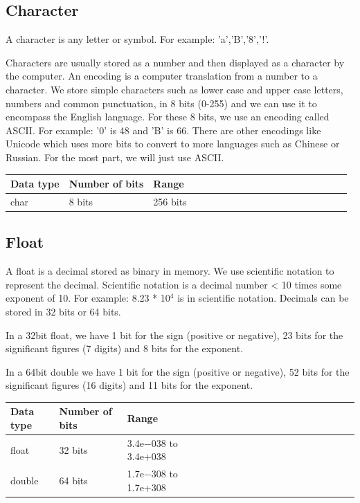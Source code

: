 \documentclass[11pt,oneside]{book}
\begin{document}
\subsection{Character}

A character is any letter or symbol. For example: 'a','B','8','!'.

Characters are usually stored as a number and then displayed as a character by the computer. An encoding is a computer translation from a number to a character. We store simple characters such as lower case and upper case letters, numbers and common punctuation, in 8 bits (0-255) and we can use it to encompass the English language. For these 8 bits, we use an encoding called ASCII. For example: '0' is 48 and 'B' is 66. There are other encodings like Unicode which uses more bits to convert to more languages such as Chinese or Russian. For the most part, we will just use ASCII.

\vspace{10pt} \begin{tabular}{|l|l|l|l|l|l|l|l|l|l|l|l|l|l|l|l|l|l|l}\hline


  Data type &
  Number of bits &
  Range\\
\hline


  char &
  8 bits &
  256 bits\\

\hline\end{tabular}

\subsection{Float}

A float is a decimal stored as binary in memory. We use scientific notation to represent the decimal. Scientific notation is a decimal number < 10 times some exponent of 10. For example: 8.23 * 10$^{4}$ is in scientific notation. Decimals can be stored in 32 bits or 64 bits.

In a 32bit float, we have 1 bit for the sign (positive or negative), 23 bits for the significant figures (7 digits) and 8 bits for the exponent.

In a 64bit double we have 1 bit for the sign (positive or negative), 52 bits for the significant figures (16 digits) and 11 bits for the exponent.

\vspace{10pt} \begin{tabular}{|l|l|l|l|l|l|l|l|l|l|l|l|l|l|l|l|l|l|l}\hline


  Data type &
  Number of bits &
  Range\\
\hline


  float &
  32 bits &
  3.4e−038 to 3.4e+038\\

  double &
  64 bits &
  1.7e−308 to 1.7e+308\\

\hline\end{tabular}
\end{document}
